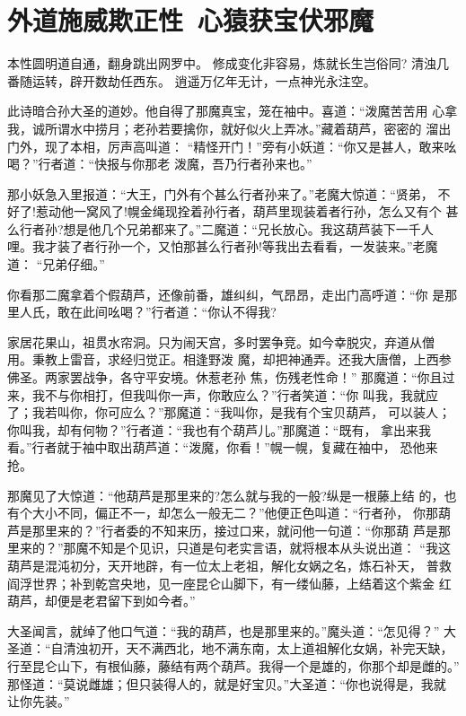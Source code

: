 \chapter{外道施威欺正性~心猿获宝伏邪魔}

本性圆明道自通，翻身跳出网罗中。
修成变化非容易，炼就长生岂俗同?
清浊几番随运转，辟开数劫任西东。
逍遥万亿年无计，一点神光永注空。

此诗暗合孙大圣的道妙。他自得了那魔真宝，笼在袖中。喜道：“泼魔苦苦用
心拿我，诚所谓水中捞月；老孙若要擒你，就好似火上弄冰。”藏着葫芦，密密的
溜出门外，现了本相，厉声高叫道：
“精怪开门！”旁有小妖道：“你又是甚人，敢来吆喝？”行者道：“快报与你那老
泼魔，吾乃行者孙来也。”

那小妖急入里报道：“大王，门外有个甚么行者孙来了。”老魔大惊道：“贤弟，
不好了!惹动他一窝风了!幌金绳现拴着孙行者，葫芦里现装着者行孙，怎么又有个
甚么行者孙?想是他几个兄弟都来了。”二魔道：“兄长放心。我这葫芦装下一千人
哩。我才装了者行孙一个，又怕那甚么行者孙!等我出去看看，一发装来。”老魔道：
“兄弟仔细。”

你看那二魔拿着个假葫芦，还像前番，雄纠纠，气昂昂，走出门高呼道：“你
是那里人氏，敢在此间吆喝？”行者道：“你认不得我?

家居花果山，祖贯水帘洞。只为闹天宫，多时罢争竞。如今幸脱灾，弃道从僧
用。秉教上雷音，求经归觉正。相逢野泼
魔，却把神通弄。还我大唐僧，上西参佛圣。两家罢战争，各守平安境。休惹老孙
焦，伤残老性命！”
那魔道：“你且过来，我不与你相打，但我叫你一声，你敢应么？”行者笑道：“你
叫我，我就应了；我若叫你，你可应么？”那魔道：“我叫你，是我有个宝贝葫芦，
可以装人；你叫我，却有何物？”行者道：“我也有个葫芦儿。”那魔道：“既有，
拿出来我看。”行者就于袖中取出葫芦道：“泼魔，你看！”幌一幌，复藏在袖中，
恐他来抢。

那魔见了大惊道：“他葫芦是那里来的?怎么就与我的一般?纵是一根藤上结
的，也有个大小不同，偏正不一，却怎么一般无二？”他便正色叫道：“行者孙，
你那葫芦是那里来的？”行者委的不知来历，接过口来，就问他一句道：“你那葫
芦是那里来的？”那魔不知是个见识，只道是句老实言语，就将根本从头说出道：
“我这葫芦是混沌初分，天开地辟，有一位太上老祖，解化女娲之名，炼石补天，
普救阎浮世界；补到乾宫央地，见一座昆仑山脚下，有一缕仙藤，上结着这个紫金
红葫芦，却便是老君留下到如今者。”

大圣闻言，就绰了他口气道：“我的葫芦，也是那里来的。”魔头道：“怎见得？”
大圣道：“自清浊初开，天不满西北，地不满东南，太上道祖解化女娲，补完天缺，
行至昆仑山下，有根仙藤，藤结有两个葫芦。我得一个是雄的，你那个却是雌的。”
那怪道：“莫说雌雄；但只装得人的，就是好宝贝。”大圣道：“你也说得是，我就
让你先装。”

